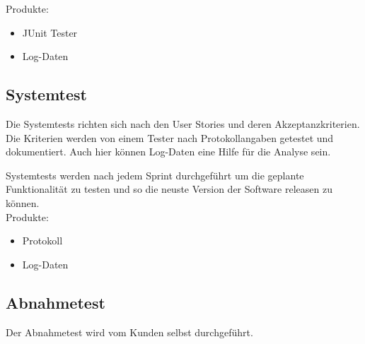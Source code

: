 Produkte:
\begin{itemize}
\item JUnit Tester
\item Log-Daten
\end{itemize}

\subsection{Systemtest}
Die Systemtests richten sich nach den User Stories und deren Akzeptanzkriterien. 
Die Kriterien werden von einem Tester nach 
Protokollangaben getestet und dokumentiert. Auch hier können Log-Daten eine Hilfe für die Analyse sein.

Systemtests werden nach jedem Sprint durchgeführt um die geplante Funktionalität 
zu testen und so die neuste Version der Software releasen zu können.\\

Produkte:
\begin{itemize}
\item Protokoll
\item Log-Daten
\end{itemize}

\subsection{Abnahmetest}
Der Abnahmetest wird vom Kunden selbst durchgeführt.
